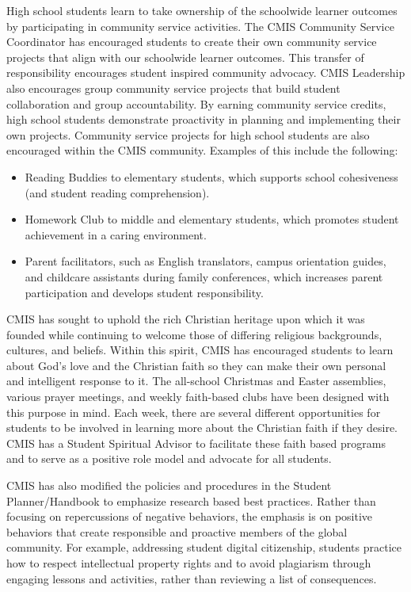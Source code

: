 High school students learn to take ownership of the schoolwide learner outcomes by participating in community service activities. The CMIS Community Service Coordinator has encouraged students to create their own community service projects that align with our schoolwide learner outcomes. This transfer of responsibility encourages student inspired community advocacy.  CMIS Leadership also encourages group community service projects that build student collaboration and group accountability. By earning community service credits, high school students demonstrate proactivity in planning and implementing their own projects.  Community service projects for high school students are also encouraged within the CMIS community. Examples of this include the following: 
\begin{itemize}
\item Reading Buddies to elementary students, which supports school cohesiveness (and student reading comprehension). 
\item Homework Club to middle and elementary students, which promotes student achievement in a caring environment. 
\item Parent facilitators, such as English translators, campus orientation guides, and childcare assistants during family conferences, which increases parent participation and develops student responsibility.
\end{itemize}

CMIS has sought to uphold the rich Christian heritage upon which it was founded while continuing to welcome those of differing religious backgrounds, cultures, and beliefs. Within this spirit, CMIS has encouraged students to learn about God’s love and the Christian faith so they can make their own personal and intelligent response to it. The all-school Christmas and Easter assemblies, various prayer meetings, and weekly faith-based clubs have been designed with this purpose in mind. Each week, there are several different opportunities for students to be involved in learning more about the Christian faith if they desire. CMIS has a Student Spiritual Advisor to facilitate these faith based programs and to serve as a positive role model and advocate for all students.

CMIS has also modified the policies and procedures in the Student Planner/Handbook to emphasize research based best practices. Rather than focusing on repercussions of negative behaviors, the emphasis is on positive behaviors that create responsible and proactive members of the global community.  For example, addressing student digital citizenship, students practice how to respect intellectual property rights and to avoid plagiarism through engaging lessons and activities, rather than reviewing a list of consequences. 

